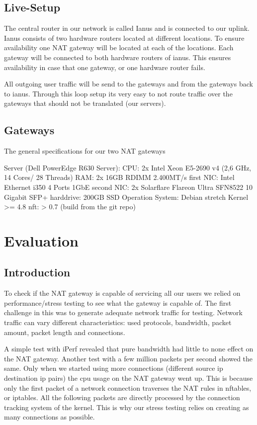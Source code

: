 \documentclass{report}
\begin{document}
\section{Live-Setup}\label{live-setup}

The central router in our network is called Ianus and is connected to
our uplink. Ianus consists of two hardware routers located at different
locations. To ensure availability one NAT gateway will be located at
each of the locations. Each gateway will be connected to both hardware
routers of ianus. This ensures availability in case that one gateway, or
one hardware router fails.

All outgoing user traffic will be send to the gateways and from the
gateways back to ianus. Through this loop setup its very easy to not
route traffic over the gateways that should not be translated (our
servers).

\section{Gateways}\label{gateways}

The general specifications for our two NAT gateways

Server (Dell PowerEdge R630 Server): CPU: 2x Intel Xeon E5-2690 v4 (2,6
GHz, 14 Cores/ 28 Threads) RAM: 2x 16GB RDIMM 2.400MT/s first NIC: Intel
Ethernet i350 4 Ports 1GbE second NIC: 2x Solarflare Flareon Ultra
SFN8522 10 Gigabit SFP+ harddrive: 200GB SSD Operation System: Debian
stretch Kernel \textgreater{}= 4.8 nft: \textgreater{} 0.7 (build from
the git repo)

\chapter{Evaluation}\label{evaluation}

\section{Introduction}\label{introduction-1}

To check if the NAT gateway is capable of servicing all our users we
relied on performance/stress testing to see what the gateway is capable
of. The first challenge in this was to generate adequate network traffic
for testing. Network traffic can vary different characteristics: used
protocols, bandwidth, packet amount, packet length and connections.

A simple test with iPerf\cite{iperf} revealed that pure bandwidth had little
to none effect on the NAT gateway. Another test with a few million
packets per second showed the same. Only when we started using more
connections (different source ip destination ip pairs) the cpu usage on
the NAT gateway went up. This is because only the first packet of a
network connection traverses the NAT rules in nftables, or iptables. All
the following packets are directly processed by the connection tracking
system of the kernel. This is why our stress testing relies on creating
as many connections as possible.
\end{document}

